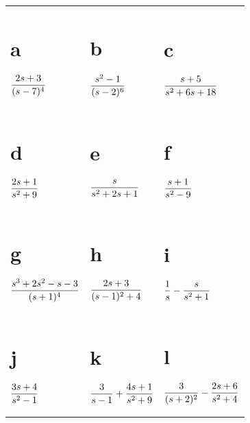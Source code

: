 \begin{exerciselist}
  \begin{tabular}[t]{@{}p{112pt}@{}p{112pt}@{}p{112pt}}
    \part{a} $\displaystyle\frac{2s+3}{(s-7)^{4}}$             & \part{b} $\displaystyle\frac{s^{2}-1}{(s-2)^{6}}$          & \part{c} $\displaystyle\frac{s+5}{s^{2}+6s+18}$                  \\[10pt]
    \part{d} $\displaystyle\frac{2s+1}{s^{2}+9}$               & \part{e} $\displaystyle\frac{s}{s^{2}+2s+1}$               & \part{f} $\displaystyle\frac{s+1}{s^{2}-9}$                      \\[10pt]
    \part{g} $\displaystyle\frac{s^{3}+2s^{2}-s-3}{(s+1)^{4}}$ & \part{h} $\displaystyle\frac{2s+3}{(s-1)^{2}+4}$           & \part{i} $\displaystyle\frac{1}{s}-\frac{s}{s^{2}+1}$            \\[10pt]
    \part{j} $\displaystyle\frac{3s+4}{s^{2}-1}$               & \part{k} $\displaystyle\frac{3}{s-1}+\frac{4s+1}{s^{2}+9}$ & \part{l} $\displaystyle\frac{3}{(s+2)^{2}}-\frac{2s+6}{s^{2}+4}$
  \end{tabular}


\end{exerciselist}
